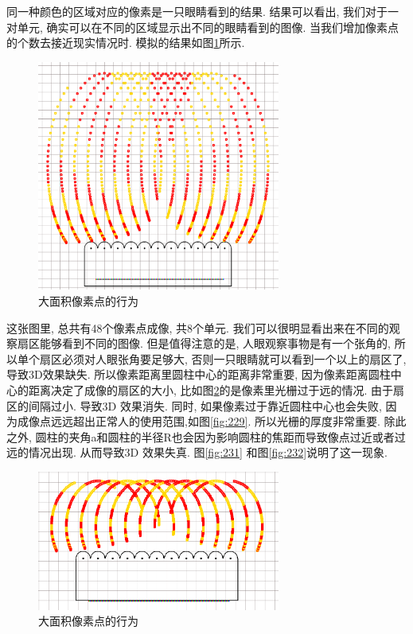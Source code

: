 \documentclass[a4paper, 11pt]{article}
\begin{document}
\begin{CJK}{UTF8}{gbsn}
同一种颜色的区域对应的像素是一只眼睛看到的结果. 结果可以看出, 我们对于一对单元, 确实可以在不同的区域显示出不同的眼睛看到的图像. 当我们增加像素点的个数去接近现实情况时. 模拟的结果如图\ref{fig:225}所示.
\begin{figure}[h!]
  \centerline{\includegraphics[width=8cm]{225.png}}
  \caption{大面积像素点的行为}
  \label{fig:225}
\end{figure}

这张图里, 总共有48个像素点成像, 共8个单元. 我们可以很明显看出来在不同的观察扇区能够看到不同的图像. 但是值得注意的是, 人眼观察事物是有一个张角的, 所以单个扇区必须对人眼张角要足够大, 否则一只眼睛就可以看到一个以上的扇区了, 导致3D效果缺失. 所以像素距离里圆柱中心的距离非常重要, 因为像素距离圆柱中心的距离决定了成像的扇区的大小, 比如图\ref{fig:228}的是像素里光栅过于远的情况. 由于扇区的间隔过小. 导致3D 效果消失. 同时, 如果像素过于靠近圆柱中心也会失败, 因为成像点远远超出正常人的使用范围,如图\ref{fig:229}. 所以光栅的厚度非常重要. 除此之外, 圆柱的夹角a和圆柱的半径R也会因为影响圆柱的焦距而导致像点过近或者过远的情况出现. 从而导致3D 效果失真. 图\ref{fig:231} 和图\ref{fig:232}说明了这一现象.
\begin{figure}[h!]
  \centerline{\includegraphics[width=8cm]{228.png}}
  \caption{大面积像素点的行为}
  \label{fig:228}
\end{figure}


\end{CJK}
\end{document}
